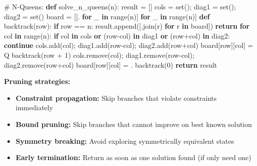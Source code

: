 \documentclass[11pt]{article}
\providecommand{\tightlist}{\setlength{\itemsep}{1pt}\setlength{\parskip}{0pt}}
\newenvironment{Shaded}{\begin{snugshade}}{\end{snugshade}}
\newcommand{\BuiltInTok}[1]{\textcolor[rgb]{0.50,0.55,0.55}{#1}}
\newcommand{\CommentTok}[1]{\textcolor[rgb]{0.48,0.49,0.49}{#1}}
\newcommand{\ControlFlowTok}[1]{\textcolor[rgb]{0.99,0.74,0.29}{\textbf{#1}}}
\newcommand{\DecValTok}[1]{\textcolor[rgb]{0.96,0.45,0.00}{#1}}
\newcommand{\KeywordTok}[1]{\textcolor[rgb]{0.81,0.81,0.76}{\textbf{#1}}}
\newcommand{\NormalTok}[1]{\textcolor[rgb]{0.81,0.81,0.76}{#1}}
\newcommand{\OperatorTok}[1]{\textcolor[rgb]{0.81,0.81,0.76}{#1}}
\newcommand{\StringTok}[1]{\textcolor[rgb]{0.96,0.31,0.31}{#1}}
\begin{document}
\begin{Shaded}
\begin{Highlighting}[]
\CommentTok{\# N{-}Queens:}
\KeywordTok{def}\NormalTok{ solve\_n\_queens(n):}
\NormalTok{    result }\OperatorTok{=}\NormalTok{ []}
\NormalTok{    cols }\OperatorTok{=} \BuiltInTok{set}\NormalTok{()}\OperatorTok{;}\NormalTok{ diag1 }\OperatorTok{=} \BuiltInTok{set}\NormalTok{()}\OperatorTok{;}\NormalTok{ diag2 }\OperatorTok{=} \BuiltInTok{set}\NormalTok{()}
\NormalTok{    board }\OperatorTok{=}\NormalTok{ [[}\StringTok{\textquotesingle{}.\textquotesingle{}} \ControlFlowTok{for}\NormalTok{ \_ }\KeywordTok{in} \BuiltInTok{range}\NormalTok{(n)] }\ControlFlowTok{for}\NormalTok{ \_ }\KeywordTok{in} \BuiltInTok{range}\NormalTok{(n)]}
    \KeywordTok{def}\NormalTok{ backtrack(row):}
        \ControlFlowTok{if}\NormalTok{ row }\OperatorTok{==}\NormalTok{ n:}
\NormalTok{            result.append([}\StringTok{\textquotesingle{}\textquotesingle{}}\NormalTok{.join(r) }\ControlFlowTok{for}\NormalTok{ r }\KeywordTok{in}\NormalTok{ board])}
            \ControlFlowTok{return}
        \ControlFlowTok{for}\NormalTok{ col }\KeywordTok{in} \BuiltInTok{range}\NormalTok{(n):}
            \ControlFlowTok{if}\NormalTok{ col }\KeywordTok{in}\NormalTok{ cols }\KeywordTok{or}\NormalTok{ (row}\OperatorTok{{-}}\NormalTok{col) }\KeywordTok{in}\NormalTok{ diag1 }\KeywordTok{or}\NormalTok{ (row}\OperatorTok{+}\NormalTok{col) }\KeywordTok{in}\NormalTok{ diag2:}
                \ControlFlowTok{continue}
\NormalTok{            cols.add(col)}\OperatorTok{;}\NormalTok{ diag1.add(row}\OperatorTok{{-}}\NormalTok{col)}\OperatorTok{;}\NormalTok{ diag2.add(row}\OperatorTok{+}\NormalTok{col)}
\NormalTok{            board[row][col] }\OperatorTok{=} \StringTok{\textquotesingle{}Q\textquotesingle{}}
\NormalTok{            backtrack(row }\OperatorTok{+} \DecValTok{1}\NormalTok{)}
\NormalTok{            cols.remove(col)}\OperatorTok{;}\NormalTok{ diag1.remove(row}\OperatorTok{{-}}\NormalTok{col)}\OperatorTok{;}\NormalTok{ diag2.remove(row}\OperatorTok{+}\NormalTok{col)}
\NormalTok{            board[row][col] }\OperatorTok{=} \StringTok{\textquotesingle{}.\textquotesingle{}}
\NormalTok{    backtrack(}\DecValTok{0}\NormalTok{)}
    \ControlFlowTok{return}\NormalTok{ result}
\end{Highlighting}
\end{Shaded}

\textbf{Pruning strategies:}

\begin{itemize}
\tightlist
\item
  \textbf{Constraint propagation:} Skip branches that violate constraints immediately
\item
  \textbf{Bound pruning:} Skip branches that cannot improve on best known solution
\item
  \textbf{Symmetry breaking:} Avoid exploring symmetrically equivalent states
\item
  \textbf{Early termination:} Return as soon as one solution found (if only need one)
\end{itemize}
\end{document}
